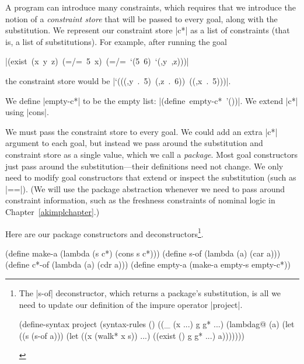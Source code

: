 
A program can introduce many constraints, which requires that we
introduce the notion of a \emph{constraint store} that will be passed to
every goal, along with the substitution.  We represent our constraint
store \scheme|c*| as a list of constraints (that is, a list of
substitutions).  For example, after running the goal

\wspace

\noindent
\mbox{\scheme|(exist (x y z) (=/= 5 x) (=/= `(5 6) `(,y ,z)))|}

\wspace

\noindent
the constraint store would be \mbox{\scheme|`(((,y . 5) (,z . 6)) ((,x . 5)))|}.

We define \scheme|empty-c*| to be the empty list: \mbox{\scheme|(define empty-c* '())|}.
 We extend \scheme|c*| using \scheme|cons|.

We must pass the constraint store to every goal.  We could add an
extra \scheme|c*| argument to each goal, but instead we pass around
the substitution and constraint store as a single value, which we call
a \emph{package}.  Most goal constructors just pass around the
substitution---their definitions need not change.  We only need to
modify goal constructors that extend or inspect the substitution (such
as \scheme|==|).
(We will use the package abstraction whenever we need to pass around
constraint information, such as the freshness constraints of nominal
logic in Chapter~\ref{akimplchapter}.)

Here are our package constructors and deconstructors\footnote{The
\scheme|s-of| deconstructor, which returns a package's substitution,
is all we need to update our definition of the impure operator
\scheme|project|.
\begin{schemedisplay}
(define-syntax project 
  (syntax-rules ()                                                              
    ((_ (x ...) g g* ...)
     (lambdag@ (a)
       (let ((s (s-of a)))
         (let ((x (walk* x s)) ...)
           ((exist () g g* ...) a)))))))
\end{schemedisplay}}.

\wspace

\begin{schemedisplay}
(define make-a (lambda (s c*) (cons s c*)))
(define s-of (lambda (a) (car a)))
(define c*-of (lambda (a) (cdr a)))
(define empty-a (make-a empty-s empty-c*))
\end{schemedisplay}







